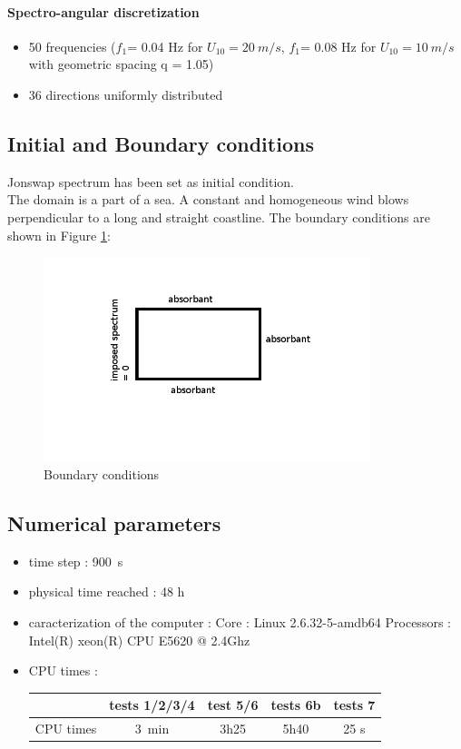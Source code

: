 \paragraph{Spectro-angular discretization}
\begin{itemize}
\item 50 frequencies ($f_1 $= 0.04 Hz for $U_{10} = 20~m/s$, $f_1 $= 0.08 Hz for $U_{10} = 10~m/s$ with geometric spacing q = 1.05)
\item 36 directions uniformly distributed
\end{itemize}

\subsection{Initial and Boundary conditions}
Jonswap spectrum has been set as initial condition.\\
The domain is a part of a sea. A constant and homogeneous wind blows perpendicular to a long and straight coastline. The boundary conditions are shown in Figure \ref{boundaryfet}:
\begin{figure}
\centering
\includegraphics[width=0.85\textwidth]{boundarycond.jpg}
\caption{Boundary conditions}
\label{boundaryfet}
\end{figure}
\subsection{Numerical parameters}
\begin{itemize}
\item time step : 900~s
\item physical time reached : 48 h
\item caracterization of the computer : \subitem Core : Linux 2.6.32-5-amdb64 \subitem Processors : Intel(R)
xeon(R) CPU E5620 @ 2.4Ghz
\item CPU times : \\
\begin{tabular}{c|c|c|c|c}
 & tests 1/2/3/4 & test 5/6 &tests 6b & tests 7\\
 \hline
CPU times & 3~min & 3h25 & 5h40 & 25 s \\
\end{tabular}
\end{itemize}

